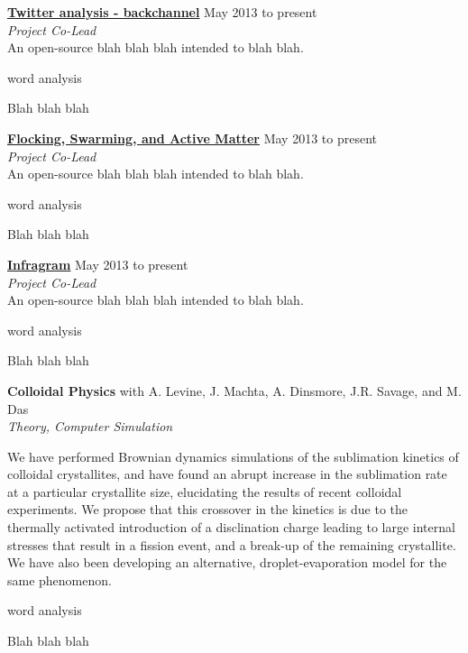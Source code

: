 \documentclass[10pt]{article}
\newcommand{\blankline}{\quad\pagebreak[3]}
\newcommand{\halfblankline}{\quad\vspace{-0.5\baselineskip}\pagebreak[3]}
\begin{document}
\blankline

\href{http://openwaterproject.io}{\textbf{Twitter analysis - backchannel}} \hfill {May 2013 to present} \\
\emph{Project Co-Lead} \\
An open-source blah blah blah intended to blah blah.
    \begin{innerlist}
        \item word analysis
        \item Blah blah blah 

\end{innerlist}

\blankline

\href{http://openwaterproject.io}{\textbf{Flocking, Swarming, and Active Matter}} \hfill {May 2013 to present} \\
\emph{Project Co-Lead} \\
An open-source blah blah blah intended to blah blah.
    \begin{innerlist}
        \item word analysis
        \item Blah blah blah 

\end{innerlist}

\blankline

\href{http://openwaterproject.io}{\textbf{Infragram}} \hfill {May 2013 to present} \\
\emph{Project Co-Lead} \\
An open-source blah blah blah intended to blah blah.
    \begin{innerlist}
        \item word analysis
        \item Blah blah blah 

\end{innerlist}

\blankline


\textbf{Colloidal Physics} \hfill {with A. Levine, J. Machta, A. Dinsmore, J.R. Savage, and M. Das} \\
\emph{Theory, Computer Simulation} 

\halfblankline

We have performed Brownian dynamics simulations of the sublimation kinetics of colloidal crystallites, and
have found an abrupt increase in the sublimation rate at a particular crystallite size, elucidating the results of
recent colloidal experiments. We propose that this crossover in the kinetics is due to the thermally activated
introduction of a disclination charge leading to large internal stresses that result in a fission event, and a
break-up of the remaining crystallite. We have also been developing an alternative, droplet-evaporation
model for the same phenomenon.
    \begin{innerlist}
        \item word analysis
        \item Blah blah blah 

\end{innerlist}
\end{document}
